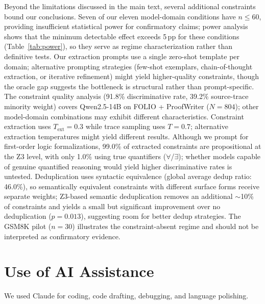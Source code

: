 Beyond the limitations discussed in the main text, several additional constraints bound our conclusions. Seven of our eleven model-domain conditions have $n \leq 60$, providing insufficient statistical power for confirmatory claims; power analysis shows that the minimum detectable effect exceeds 5\,pp for these conditions (Table~\ref{tab:power}), so they serve as regime characterization rather than definitive tests. Our extraction prompts use a single zero-shot template per domain; alternative prompting strategies (few-shot exemplars, chain-of-thought extraction, or iterative refinement) might yield higher-quality constraints, though the oracle gap suggests the bottleneck is structural rather than prompt-specific. The constraint quality analysis (91.8\% discriminative rate, 39.2\% source-trace minority weight) covers Qwen2.5-14B on FOLIO + ProofWriter ($N = 804$); other model-domain combinations may exhibit different characteristics. Constraint extraction uses $T_{\text{ext}} = 0.3$ while trace sampling uses $T = 0.7$; alternative extraction temperatures might yield different results. Although we prompt for first-order logic formalizations, 99.0\% of extracted constraints are propositional at the Z3 level, with only 1.0\% using true quantifiers ($\forall$/$\exists$); whether models capable of genuine quantified reasoning would yield higher discriminative rates is untested. Deduplication uses syntactic equivalence (global average dedup ratio: 46.0\%), so semantically equivalent constraints with different surface forms receive separate weights; Z3-based semantic deduplication removes an additional ${\sim}$10\% of constraints and yields a small but significant improvement over no deduplication ($p = 0.013$), suggesting room for better dedup strategies. The GSM8K pilot ($n = 30$) illustrates the constraint-absent regime and should not be interpreted as confirmatory evidence.

\section{Use of AI Assistance}
We used Claude for coding, code drafting, debugging, and language polishing.
